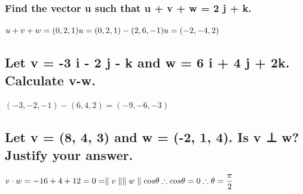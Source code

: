 \documentclass[12pt,a4paper]{article}
\begin{document}
\subsubsection{Find the vector u such that u + v + w = 2 j + k. }
$u+v+w=(0,2,1)\\
u = (0,2,1)-(2,6,-1)\\
u = (-2,-4,2)
$
\subsection{Let v = -3 i - 2 j - k and w = 6 i + 4 j + 2k. Calculate v-w.} 
	$(-3,-2,-1)-(6,4,2)=(-9,-6,-3)$
\subsection{Let v = (8, 4, 3) and w = (-2, 1, 4). Is v ⊥ w? Justify your answer.} 
	$v\cdot w = -16 + 4 +12 = 0 = \parallel v \parallel \parallel w \parallel cos\theta \\
	\therefore cos\theta = 0\\ \therefore \theta = \dfrac{\pi}{2}$
\end{document}
